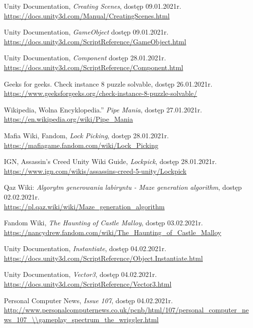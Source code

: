\documentclass[oneside,polski,logo]{amuthesis}
\begin{document}
\begin{thebibliography}{100}
Unity Documentation, \emph{Creating Scenes}, dostęp 09.01.2021r.
\\ \url{https://docs.unity3d.com/Manual/CreatingScenes.html}

Unity Documentation, \emph{GameObject} dostęp 09.01.2021r.
\\ \url{https://docs.unity3d.com/ScriptReference/GameObject.html}

Unity Documentation, \emph{Component} dostęp 28.01.2021r.
\\ \url{https://docs.unity3d.com/ScriptReference/Component.html}

Geeks for geeks. Check instance 8 puzzle solvable, dostęp 26.01.2021r.
\\ \url{https://www.geeksforgeeks.org/check-instance-8-puzzle-solvable/}

Wikipedia, Wolna Encyklopedia.” \emph{Pipe Mania}, dostęp 27.01.2021r.
\\ \url{https://en.wikipedia.org/wiki/Pipe\_Mania}

Mafia Wiki, Fandom, \emph{Lock Picking}, dostęp 28.01.2021r.
\\ \url{https://mafiagame.fandom.com/wiki/Lock\_Picking}

IGN, Assassin's Creed Unity Wiki Guide, \emph{Lockpick}, dostęp 28.01.2021r.
\\ \url{https://www.ign.com/wikis/assassins-creed-5-unity/Lockpick}

Qaz Wiki: \emph{Algorytm generowania labiryntu - Maze generation algorithm}, dostęp 02.02.2021r.
\\ \url{https://pl.qaz.wiki/wiki/Maze\_generation\_algorithm}

Fandom Wiki, \emph{The Haunting of Castle Malloy}, dostęp 03.02.2021r.
\\ \url{https://nancydrew.fandom.com/wiki/The\_Haunting\_of\_Castle\_Malloy}

Unity Documentation, \emph{Instantiate}, dostęp 04.02.2021r.
\\ \url{https://docs.unity3d.com/ScriptReference/Object.Instantiate.html}

Unity Documentation, \emph{Vector3}, dostęp 04.02.2021r.
\\ \url{https://docs.unity3d.com/ScriptReference/Vector3.html}

Personal Computer News, \emph{Issue 107}, dostęp 04.02.2021r.
\\ \url{http://www.personalcomputernews.co.uk/pcnb/html/107/personal\_computer\_news\_107\_\\gameplay\_spectrum\_the\_wriggler.html}


\end{thebibliography}
\end{document}
